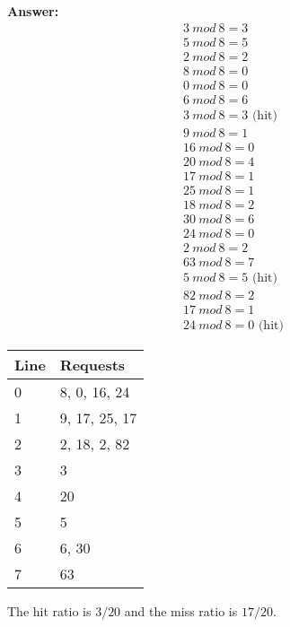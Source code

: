 \documentclass[12pt]{article}
\begin{document}
\begin{enumerate}
  \textbf{Answer:}
  \begin{align*}
    3 \ mod \ 8 = 3 \\
    5 \ mod \ 8 = 5 \\
    2 \ mod \ 8 = 2 \\
    8 \ mod \ 8 = 0 \\
    0 \ mod \ 8 = 0 \\
    6 \ mod \ 8 = 6 \\
    3 \ mod \ 8 = 3 \text{ (hit)} \\
    9 \ mod \ 8 = 1 \\
    16 \ mod \ 8 = 0 \\
    20 \ mod \ 8 = 4 \\
    17 \ mod \ 8 = 1 \\
    25 \ mod \ 8 = 1 \\
    18 \ mod \ 8 = 2 \\
    30 \ mod \ 8 = 6 \\
    24 \ mod \ 8 = 0 \\
    2 \ mod \ 8 = 2 \\
    63 \ mod \ 8 = 7 \\
    5 \ mod \ 8 = 5 \text{ (hit)} \\
    82 \ mod \ 8 = 2 \\
    17 \ mod \ 8 = 1 \\
    24 \ mod \ 8 = 0 \text{ (hit)}
  \end{align*}

  \begin{center}
    \begin{tabular}{ |l|l| } 
      \hline
      \textbf{Line} & \textbf{Requests} \\
      \hline
      0 & 8, 0, 16, 24 \\
      \hline
      1 & 9, 17, 25, 17 \\
      \hline
      2 & 2, 18, 2, 82 \\
      \hline
      3 & 3 \\
      \hline
      4 & 20 \\
      \hline
      5 & 5 \\
      \hline
      6 & 6, 30 \\
      \hline
      7 & 63 \\
      \hline
    \end{tabular}
  \end{center}

  The hit ratio is $3/20$ and the miss ratio is $17/20$.

  \end{enumerate}
\end{document}
